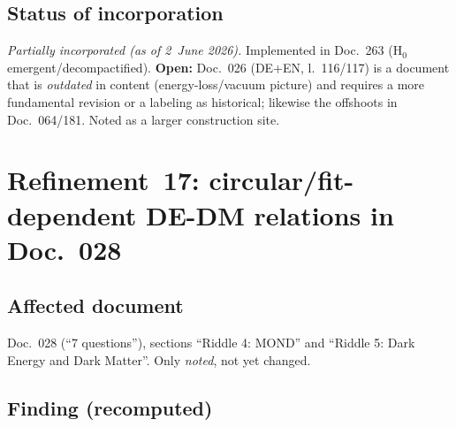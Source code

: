 \subsection*{Status of incorporation}

\emph{Partially incorporated (as of 2~June 2026).} Implemented in Doc.~263
(H$_0$ emergent/decompactified). \textbf{Open:} Doc.~026 (DE+EN, l.~116/117) is
a document that is \emph{outdated} in content (energy-loss/vacuum picture) and
requires a more fundamental revision or a labeling as historical; likewise the
offshoots in Doc.~064/181. Noted as a larger construction site.

\section{\texorpdfstring{Refinement~17: circular/fit-dependent DE-DM relations in Doc.~028}{Refinement 17: circular DE-DM relations in Doc 028}}

\subsection*{Affected document}

Doc.~028 (\enquote{7 questions}), sections \enquote{Riddle 4: MOND} and
\enquote{Riddle 5: Dark Energy and Dark Matter}. Only \emph{noted}, not yet
changed.

\subsection*{Finding (recomputed)}

